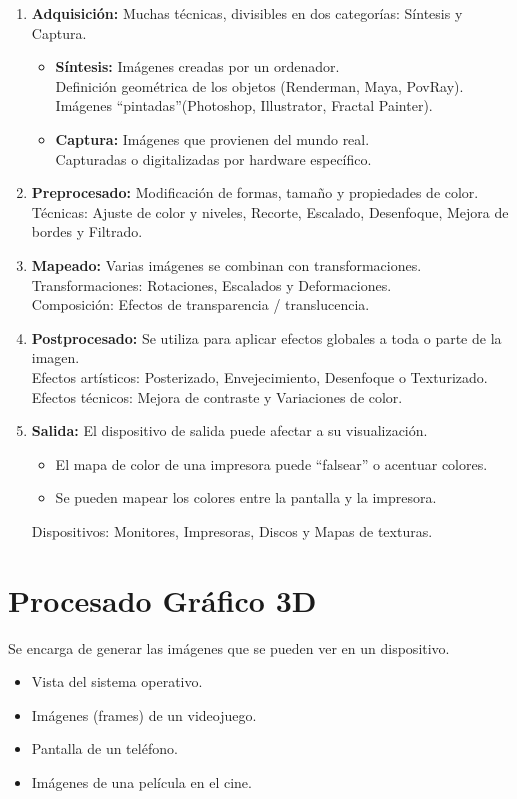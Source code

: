 \begin{enumerate}
	\item \textbf{Adquisición:} Muchas técnicas, divisibles en dos categorías: Síntesis y Captura.
	      \begin{itemize}
		      \item \textbf{Síntesis:} Imágenes creadas por un ordenador. \\ Definición geométrica de los objetos (Renderman, Maya, PovRay). \\ Imágenes \enquote{pintadas}(Photoshop, Illustrator, Fractal Painter).
		      \item \textbf{Captura:} Imágenes que provienen del mundo real. \\ Capturadas o digitalizadas por hardware específico.
	      \end{itemize}
	\item \textbf{Preprocesado:} Modificación de formas, tamaño y propiedades de color. \\ Técnicas: Ajuste de color y niveles, Recorte, Escalado, Desenfoque, Mejora de bordes y Filtrado.
	\item \textbf{Mapeado:} Varias imágenes se combinan con transformaciones. \\ Transformaciones: Rotaciones, Escalados y Deformaciones. \\ Composición: Efectos de transparencia / translucencia.
	\item \textbf{Postprocesado:} Se utiliza para aplicar efectos globales a toda o parte de la imagen. \\ Efectos artísticos: Posterizado, Envejecimiento, Desenfoque  o Texturizado. \\ Efectos técnicos: Mejora de contraste y Variaciones de color.
	\item \textbf{Salida:} El dispositivo de salida puede afectar a su visualización.
	      \begin{itemize}
		      \item El mapa de color de una impresora puede \enquote{falsear} o acentuar colores.
		      \item Se pueden mapear los colores entre la pantalla y la impresora.
	      \end{itemize}
	      Dispositivos: Monitores, Impresoras, Discos y Mapas de texturas.
\end{enumerate}

\section{Procesado Gráfico 3D}\label{sec:procesado-gráfico-3d}
Se encarga de generar las imágenes que se pueden ver en un dispositivo.
\begin{itemize}
	\item Vista del sistema operativo.
	\item Imágenes (frames) de un videojuego.
	\item Pantalla de un teléfono.
	\item Imágenes de una película en el cine.
\end{itemize}
